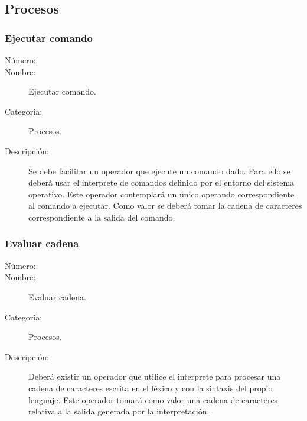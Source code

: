 \subsection{Procesos}

\subsubsection{Ejecutar comando}
\begin{framed}
	\begin{description}
		\item [Número:] \cn
		\item [Nombre:] Ejecutar comando.
		\item [Categoría:] Procesos.
		\item [Descripción:] Se debe facilitar un operador que ejecute un comando dado. 
		Para ello se deberá usar el interprete de comandos definido por el entorno del sistema operativo. Este operador contemplará
		un único operando correspondiente al comando a ejecutar. Como valor se deberá tomar la cadena de caracteres correspondiente 
		a la salida del comando.
	\end{description}
\end{framed}

\subsubsection{Evaluar cadena}
\begin{framed}
	\begin{description}
		\item [Número:] \cn
		\item [Nombre:] Evaluar cadena.
		\item [Categoría:] Procesos.
		\item [Descripción:] Deberá existir un operador que utilice el interprete para procesar una cadena de caracteres escrita en 
		el léxico y con la sintaxis del propio lenguaje. Este operador tomará como valor una cadena de caracteres relativa a la salida 
		generada por la interpretación.
	\end{description}
\end{framed}

